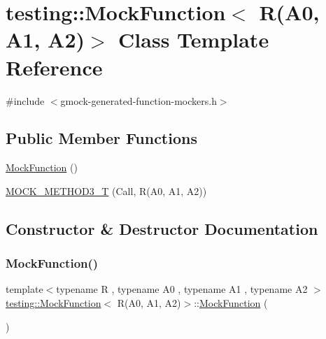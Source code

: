\hypertarget{classtesting_1_1MockFunction_3_01R_07A0_00_01A1_00_01A2_08_4}{}\section{testing\+::Mock\+Function$<$ R(A0, A1, A2)$>$ Class Template Reference}
\label{classtesting_1_1MockFunction_3_01R_07A0_00_01A1_00_01A2_08_4}


{\ttfamily \#include $<$gmock-\/generated-\/function-\/mockers.\+h$>$}

\subsection*{Public Member Functions}
\begin{DoxyCompactItemize}
\item 
\mbox{\hyperlink{classtesting_1_1MockFunction_3_01R_07A0_00_01A1_00_01A2_08_4_a33e409a6528b41103fe36844e4bb2bfe}{Mock\+Function}} ()
\item 
\mbox{\hyperlink{classtesting_1_1MockFunction_3_01R_07A0_00_01A1_00_01A2_08_4_afcc79eab94b7d873f71ccf7b08ce582f}{M\+O\+C\+K\+\_\+\+M\+E\+T\+H\+O\+D3\+\_\+T}} (Call, R(A0, A1, A2))
\end{DoxyCompactItemize}


\subsection{Constructor \& Destructor Documentation}
\mbox{\label{classtesting_1_1MockFunction_3_01R_07A0_00_01A1_00_01A2_08_4_a33e409a6528b41103fe36844e4bb2bfe}} 
\subsubsection{\texorpdfstring{MockFunction()}{MockFunction()}}
{\footnotesize\ttfamily template$<$typename R , typename A0 , typename A1 , typename A2 $>$ \\
\mbox{\hyperlink{classtesting_1_1MockFunction}{testing\+::\+Mock\+Function}}$<$ R(A0, A1, A2)$>$\+::\mbox{\hyperlink{classtesting_1_1MockFunction}{Mock\+Function}} (\begin{DoxyParamCaption}{ }\end{DoxyParamCaption})\hspace{0.3cm}{\ttfamily [inline]}}



